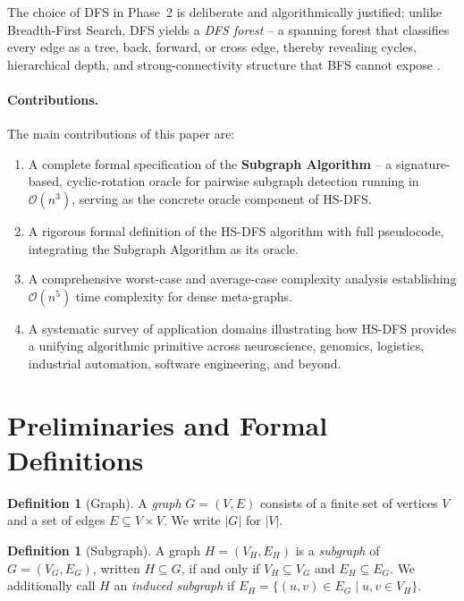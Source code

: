 ﻿\documentclass[12pt,a4paper]{article}
\theoremstyle{plain}
\theoremstyle{definition}
\newtheorem{definition}[theorem]{Definition}
\theoremstyle{remark}
\begin{document}
	The choice of DFS in Phase~2 is deliberate and algorithmically justified:
	unlike Breadth-First Search, DFS yields a \emph{DFS forest} -- a spanning
	forest that classifies every edge as a tree, back, forward, or cross edge,
	thereby revealing cycles, hierarchical depth, and strong-connectivity
	structure that BFS cannot expose \cite{cormen2009}.
	
	\paragraph{Contributions.} The main contributions of this paper are:
	\begin{enumerate}[label=(\roman*)]
		\item A complete formal specification of the \textbf{Subgraph Algorithm}
		\cite{epp2026subgraph} -- a signature-based, cyclic-rotation oracle for
		pairwise subgraph detection running in $\mathcal{O}(n^3)$, serving as
		the concrete oracle component of HS-DFS.
		\item A rigorous formal definition of the HS-DFS algorithm with full
		pseudocode, integrating the Subgraph Algorithm as its oracle.
		\item A comprehensive worst-case and average-case complexity analysis
		establishing $\mathcal{O}(n^5)$ time complexity for dense meta-graphs.
		\item A systematic survey of application domains illustrating how HS-DFS
		provides a unifying algorithmic primitive across neuroscience, genomics,
		logistics, industrial automation, software engineering, and beyond.
	\end{enumerate}
	
	\section{Preliminaries and Formal Definitions}
	\label{sec:prelim}
	
	\begin{definition}[Graph]
		A \emph{graph} $G = (V, E)$ consists of a finite set of vertices $V$ and a
		set of edges $E \subseteq V \times V$.  We write $|G|$ for $|V|$.
	\end{definition}
	
	\begin{definition}[Subgraph]
		A graph $H = (V_H, E_H)$ is a \emph{subgraph} of $G = (V_G, E_G)$,
		written $H \subseteq G$, if and only if $V_H \subseteq V_G$ and
		$E_H \subseteq E_G$.  We additionally call $H$ an \emph{induced subgraph}
		if $E_H = \{(u,v) \in E_G \mid u,v \in V_H\}$.
	\end{definition}
	
\end{document}
